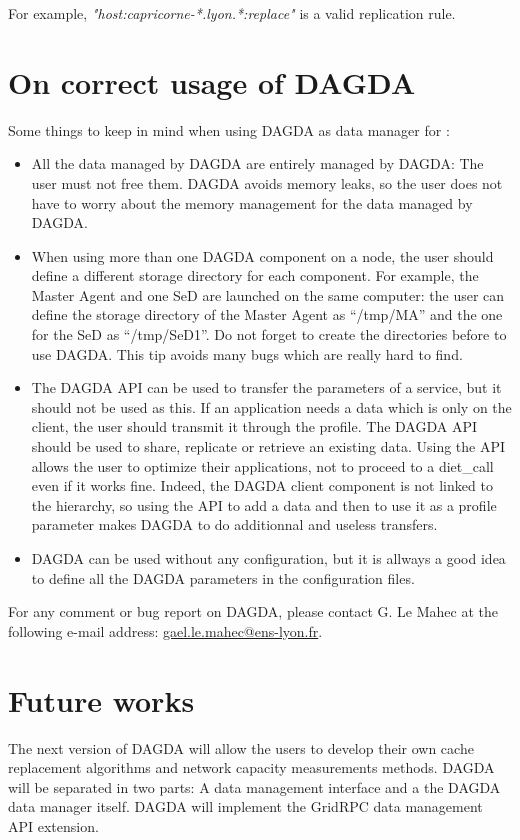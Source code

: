 For example, \textit{"host:capricorne-*.lyon.*:replace"} is a valid replication
rule.

\section{On correct usage of DAGDA}
Some things to keep in mind when using DAGDA as data manager for
\diet:
\begin{itemize}
\item All the data managed by DAGDA are entirely managed by DAGDA: The user
  must not free them. DAGDA avoids memory leaks, so the user does not
  have to worry about the memory management for the data managed by DAGDA.
\item When using more than one DAGDA component on a node, the user should
  define a different storage directory for each component. For example,
  the Master Agent and one SeD are launched on the same computer: the
  user can define the storage directory of the Master Agent as ``/tmp/MA''
  and the one for the SeD as ``/tmp/SeD1''. Do not forget to create the
  directories before to use DAGDA. This tip avoids many bugs which are
  really hard to find.
\item The DAGDA API can be used to transfer the parameters of a service,
  but it should not be used as this. If an application needs a data which
  is only on the client, the user should transmit it through the profile.
  The DAGDA API should be used to share, replicate or retrieve an existing
  data. Using the API allows the user to optimize their applications, not
  to proceed to a diet\_call even if it works fine. Indeed, the DAGDA
  client component is not linked to the \diet hierarchy, so using the API to
  add a data and then to use it as a profile parameter makes DAGDA to
  do additionnal and useless transfers.
\item DAGDA can be used without any configuration, but it is allways a
  good idea to define all the DAGDA parameters in the configuration files.
\end{itemize}

For any comment or bug report on DAGDA, please contact G. Le Mahec
at the following e-mail address: \url{gael.le.mahec@ens-lyon.fr}.

\section{Future works}
The next version of DAGDA will allow the users to develop their own cache
replacement algorithms and network capacity measurements methods.
DAGDA will be separated in two parts: A data management interface and a the
DAGDA data manager itself. DAGDA will implement the GridRPC data management API
extension.

